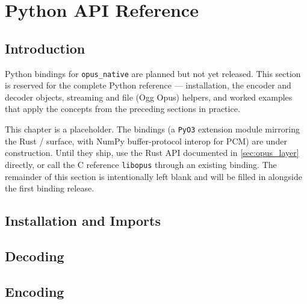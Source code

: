 
\section{Python API Reference}\label{sec:python_guide}

\subsection{Introduction}\label{subsec:python_intro}

Python bindings for \texttt{opus\_native} are planned but not yet released. This
section is reserved for the complete Python reference --- installation, the
encoder and decoder objects, streaming and file (Ogg Opus) helpers, and worked
examples that apply the concepts from the preceding sections in practice.

\begin{importantnote}
  This chapter is a placeholder. The bindings (a \texttt{PyO3} extension module
    mirroring the Rust / surface, with NumPy
  buffer-protocol interop for PCM) are under construction. Until they ship, use
  the Rust API documented in \cref{sec:opus_layer} directly, or call the C
  reference \texttt{libopus} through an existing binding. The remainder of this
  section is intentionally left blank and will be filled in alongside the
  first binding release.
\end{importantnote}

\subsection*{Installation and Imports}


\subsection*{Decoding}


\subsection*{Encoding}

